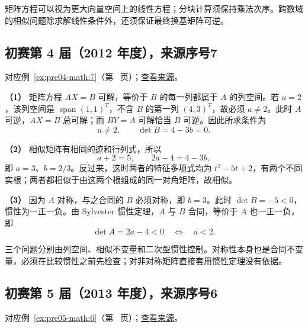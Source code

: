 \documentclass[UTF8,12pt,a4paper,fontset=fandol]{ctexart}
\begin{document}
\label{sec:solutions-9}

矩阵方程可以视为更大向量空间上的线性方程；分块计算须保持乘法次序。跨数域的相似问题除求解线性条件外，还须保证最终换基矩阵可逆。

\subsection{初赛第 4 届（2012 年度），来源序号7}\label{ans:pre04-math:7}\label{pr:pre04-math:7}

对应例~\ref{ex:pre04-math:7}（第~\pageref{ex:pre04-math:7} 页）；\href{https://github.com/lzxcr/cmc-mathematics/blob/64916fa1fdbc3e444a652eca204d5669058ee321/src/problems/preliminary/04/07.md}{查看来源}。

\begin{solve}

\textbf{（1）} 矩阵方程 $AX=B$ 可解，等价于 $B$ 的每一列都属于 $A$ 的列空间。若 $a=2$，该列空间是 $\operatorname{span}(1,1)^T$，不含 $B$ 的第一列 $(4,3)^T$，故必须 $a\ne2$。此时 $A$ 可逆，$AX=B$ 总可解；而 $BY=A$ 可解恰当 $B$ 可逆。因此所求条件为
\[
a\ne2,\qquad \det B=4-3b=0.
\]

\textbf{（2）} 相似矩阵有相同的迹和行列式，所以
\[
a+2=5,\qquad 2a-4=4-3b,
\]
即 $a=3$、$b=2/3$。反过来，这时两者的特征多项式均为 $t^2-5t+2$，有两个不同实根；两者都相似于由这两个根组成的同一对角矩阵，故相似。

\textbf{（3）} 因为 $A$ 对称，与之合同的 $B$ 必须对称，即 $b=3$。此时 $\det B=-5<0$，惯性为一正一负。由 Sylvester 惯性定理，$A$ 与 $B$ 合同，等价于 $A$ 也一正一负，即
\[
\det A=2a-4<0\quad\Longleftrightarrow\quad a<2.
\]

\end{solve}

\begin{remark}[方法与条件]

三个问题分别由列空间、相似不变量和二次型惯性控制。对称性本身也是合同不变量，必须在比较惯性之前先检查；对非对称矩阵直接套用惯性定理没有依据。

\end{remark}

\subsection{初赛第 5 届（2013 年度），来源序号6}\label{ans:pre05-math:6}\label{pr:pre05-math:6}

对应例~\ref{ex:pre05-math:6}（第~\pageref{ex:pre05-math:6} 页）；\href{https://github.com/lzxcr/cmc-mathematics/blob/64916fa1fdbc3e444a652eca204d5669058ee321/src/problems/preliminary/05/06.md}{查看来源}。
\end{document}
